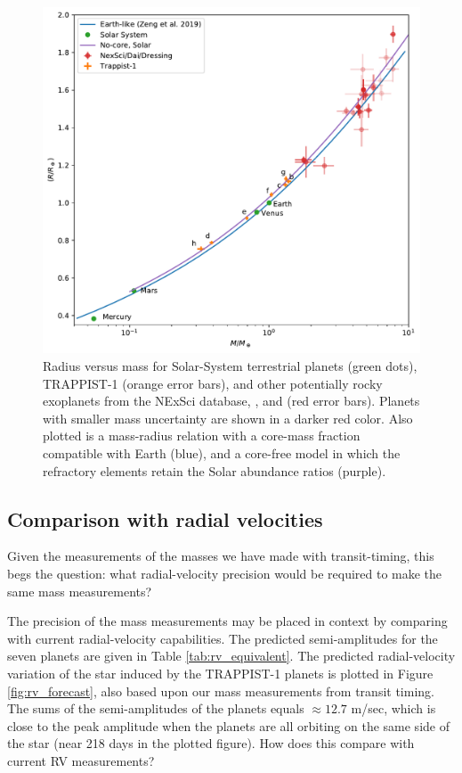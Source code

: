 \documentclass[fleqn,usenatbib]{mnras} %
\begin{document}
\begin{figure}
    \centering
    \includegraphics[width = \hsize]{figures/mass_radius_relation_comparison.pdf}
    \caption{Radius versus mass for Solar-System terrestrial planets (green dots),
    TRAPPIST-1 (orange error bars), and other potentially rocky exoplanets from the NExSci database, \citet{Dressing2015},
    and \citet{Dai2019}
    (red error bars).  Planets with smaller mass uncertainty are shown in a darker red color.  Also
    plotted is a mass-radius relation with a core-mass fraction compatible with Earth (blue), and a core-free model in which the refractory elements retain the Solar abundance ratios (purple).}
    \label{fig:mass_radius_comparison}
\end{figure}

\subsection{Comparison with radial velocities}

Given the measurements of the masses we have made with transit-timing,
this begs the question:  what radial-velocity precision would be
required to make the same mass measurements?  

The precision of the mass measurements may be placed in
context by comparing with current radial-velocity capabilities.
The predicted semi-amplitudes for the seven planets are given
in Table \ref{tab:rv_equivalent}.
The predicted radial-velocity variation of the star induced by the TRAPPIST-1
planets is plotted in Figure \ref{fig:rv_forecast}, also based upon our
mass measurements from transit timing.  The sums of the semi-amplitudes 
of the planets equals $\approx 12.7$ m/sec, which is close to the
peak amplitude when the planets are all orbiting on the same side of
the star (near 218 days in the plotted figure).  How does this compare
with current RV measurements?
\end{document}
